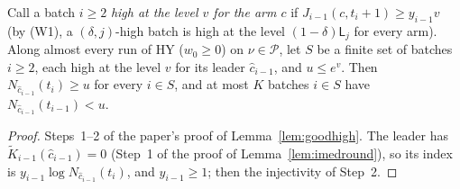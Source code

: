 \documentclass[11pt]{article}
\newcommand{\cP}{\mathcal P}
\begin{document}
\begin{lemma}[good high batches when $x=1$, on a run]\label{flem:goodhigh-run}
Call a batch $i\ge2$ \emph{high at the level $v$ for the arm $c$} if
$J_{i-1}(c,t_i+1)\ge y_{i-1}v$ (by (W1), a $(\delta,j)$-high batch is high at the level
$(1-\delta)\mathsf L_j$ for every arm). Along almost every run of HY ($w_0\ge0$) on $\nu\in\cP$, let
$S$ be a finite set of batches $i\ge2$, each high at the level $v$ for its leader $\hat c_{i-1}$,
and $u\le e^v$. Then $N_{\hat c_{i-1}}(t_i)\ge u$ for every $i\in S$, and at most $K$ batches
$i\in S$ have $N_{\hat c_{i-1}}(t_{i-1})<u$.
\end{lemma}

\begin{proof}
Steps~1--2 of the paper's proof of Lemma~\ref{lem:goodhigh}. The leader has $\tilde K_{i-1}(\hat c_{i-1})=0$
(Step~1 of the proof of Lemma~\ref{lem:imedround}), so its index is $y_{i-1}\log N_{\hat c_{i-1}}(t_i)$,
and $y_{i-1}\ge1$; then the injectivity of Step~2.
\end{proof}
\end{document}
